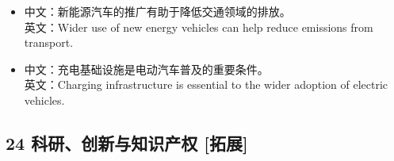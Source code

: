 \documentclass[a4paper,11pt,UTF8,fontset=none]{ctexart}
\begin{document}
\endgroup
\vspace{-2pt}

\par

\begin{itemize}[leftmargin=1.7em,itemsep=1pt,parsep=0pt,topsep=2pt]
\item \noindent 中文：新能源汽车的推广有助于降低交通领域的排放。\\ 英文：Wider use of new energy vehicles can help reduce emissions from transport.\par


\item \noindent 中文：充电基础设施是电动汽车普及的重要条件。\\ 英文：Charging infrastructure is essential to the wider adoption of electric vehicles.\par


\end{itemize}

\subsection{24 科研、创新与知识产权 {\color{AccentBlue} [拓展]}}
\end{document}
